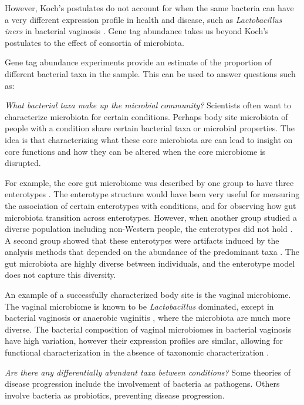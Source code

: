 However, Koch’s postulates do not account for when the same bacteria can have a very different expression profile in health and disease, such as \textit{Lactobacillus iners} in bacterial vaginosis \cite{macklaim2013comparative}. Gene tag abundance takes us beyond Koch's postulates to the effect of consortia of microbiota.

Gene tag abundance experiments provide an estimate of the proportion of different bacterial taxa in the sample. This can be used to answer questions such as:

\textit{What bacterial taxa make up the microbial community?}
Scientists often want to characterize microbiota for certain conditions. Perhaps body site microbiota of people with a condition share certain bacterial taxa or microbial properties. The idea is that characterizing what these core microbiota are can lead to insight on core functions and how they can be altered when the core microbiome is disrupted.

For example, the core gut microbiome was described by one group to have three enterotypes \cite{arumugam2011enterotypes}. The enterotype structure would have been very useful for measuring the association of certain enterotypes with conditions, and for observing how gut microbiota transition across enterotypes. However, when another group studied a diverse population including non-Western people, the enterotypes did not hold \cite{yatsunenko2012human}. A second group showed that these enterotypes were artifacts induced by the analysis methods that depended on the abundance of the predominant taxa \cite{gorvitovskaia2016interpreting}. The gut microbiota are highly diverse between individuals, and the enterotype model does not capture this diversity.

An example of a successfully characterized body site is the vaginal microbiome. The vaginal microbiome is known to be \textit{Lactobacillus} dominated, except in bacterial vaginosis \cite{hummelen2010deep} or anaerobic vaginitis \cite{donders2002definition}, where the microbiota are much more diverse. The bacterial composition of vaginal microbiomes in bacterial vaginosis have high variation, however their expression profiles are similar, allowing for functional characterization in the absence of taxonomic characterization \cite{macklaim2013comparative}.

\textit{Are there any differentially abundant taxa between conditions?}
Some theories of disease progression include the involvement of bacteria as pathogens. Others involve bacteria as probiotics, preventing disease progression.

